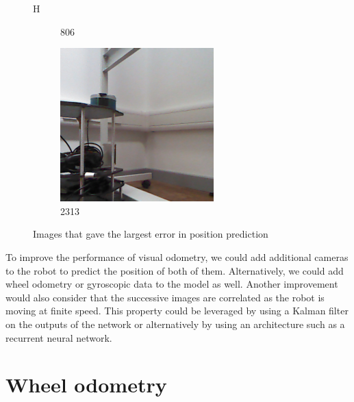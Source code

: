 \documentclass{article}
\begin{document}
\begin{figure}{H}
\begin{subfigure}[b]{0.3\textwidth}
    \caption{806}
  \end{subfigure}
  \begin{subfigure}[b]{0.3\textwidth}
    \includegraphics[width=\textwidth]{../worstimages/2019-01-31-14-39-47-973832.png}
    \caption{2313}
  \end{subfigure}
  \caption{Images that gave the largest error in position prediction}
\end{figure}

To improve the performance of visual odometry, we could add additional cameras to the robot to predict the position of both of them. Alternatively, we could add wheel odometry or gyroscopic data to the model as well. Another improvement would also consider that the successive  images are correlated as the robot is moving at finite speed. This property could be leveraged by using a Kalman filter on the outputs of the network or alternatively by using an architecture such as a recurrent neural network.



\section{Wheel odometry}
\end{document}

